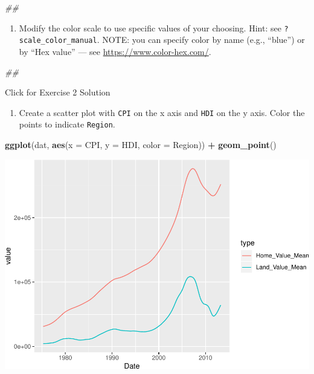 \documentclass[]{book}
\newenvironment{Shaded}{\begin{snugshade}}{\end{snugshade}}
\newcommand{\CommentTok}[1]{\textcolor[rgb]{0.56,0.35,0.01}{\textit{#1}}}
\newcommand{\DataTypeTok}[1]{\textcolor[rgb]{0.13,0.29,0.53}{#1}}
\newcommand{\KeywordTok}[1]{\textcolor[rgb]{0.13,0.29,0.53}{\textbf{#1}}}
\newcommand{\NormalTok}[1]{#1}
\newcommand{\OperatorTok}[1]{\textcolor[rgb]{0.81,0.36,0.00}{\textbf{#1}}}
\newcommand{\StringTok}[1]{\textcolor[rgb]{0.31,0.60,0.02}{#1}}
\providecommand{\tightlist}{%
  \setlength{\itemsep}{0pt}\setlength{\parskip}{0pt}}
\begin{document}
\begin{Shaded}
\begin{Highlighting}[]
\CommentTok{## }
\end{Highlighting}
\end{Shaded}

\begin{enumerate}
\def\labelenumi{\arabic{enumi}.}
\setcounter{enumi}{2}
\tightlist
\item
  Modify the color scale to use specific values of your choosing. Hint: see \texttt{?scale\_color\_manual}. NOTE: you can specify color by name (e.g., ``blue'') or by ``Hex value'' --- see \url{https://www.color-hex.com/}.
\end{enumerate}

\begin{Shaded}
\begin{Highlighting}[]
\CommentTok{## }
\end{Highlighting}
\end{Shaded}

{Click for Exercise 2 Solution}

\begin{enumerate}
\def\labelenumi{\arabic{enumi}.}
\tightlist
\item
  Create a scatter plot with \texttt{CPI} on the x axis and \texttt{HDI} on the y axis. Color the points to indicate \texttt{Region}.
\end{enumerate}

\begin{Shaded}
\begin{Highlighting}[]
\KeywordTok{ggplot}\NormalTok{(dat, }\KeywordTok{aes}\NormalTok{(}\DataTypeTok{x =}\NormalTok{ CPI, }\DataTypeTok{y =}\NormalTok{ HDI, }\DataTypeTok{color =}\NormalTok{ Region)) }\OperatorTok{+}
\StringTok{  }\KeywordTok{geom_point}\NormalTok{()}
\end{Highlighting}
\end{Shaded}

\includegraphics{R/Rgraphics/figures/unnamed-chunk-189-1.pdf}
\end{document}
